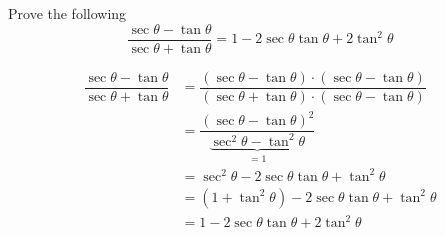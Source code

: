 

\question[1] Prove the following 
  \[\dfrac{\sec\theta - \tan\theta}{\sec\theta + \tan\theta} = 1-2\sec\theta\tan\theta + 2\tan^2\theta\]


\ifprintanswers
\fi 

\begin{solution}[\halfpage]
	\begin{align}
	   \dfrac{\sec\theta - \tan\theta}{\sec\theta + \tan\theta} &= 
	   \dfrac{(\sec\theta - \tan\theta)\cdot(\sec\theta - \tan\theta)}
	         {(\sec\theta + \tan\theta)\cdot(\sec\theta - \tan\theta)} \\
	     &= \dfrac{(\sec\theta-\tan\theta)^2}{\underbrace{\sec^2\theta-\tan^2\theta}_{=1}} \\
	     &= \sec^2\theta - 2\sec\theta\tan\theta + \tan^2\theta \\
	     &= (1 + \tan^2\theta) - 2\sec\theta\tan\theta + \tan^2\theta \\
	     &= 1 - 2\sec\theta\tan\theta + 2\tan^2\theta
	\end{align}
\end{solution}
